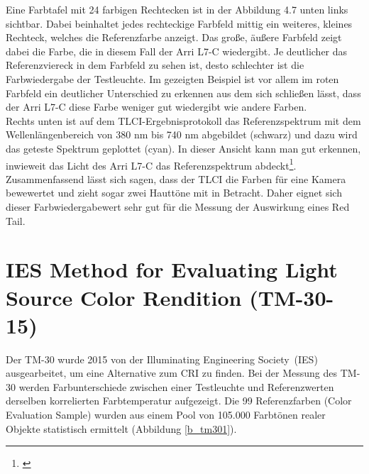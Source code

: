 Eine Farbtafel mit 24 farbigen Rechtecken ist in der Abbildung 4.7 unten links sichtbar. Dabei beinhaltet jedes rechteckige Farbfeld mittig ein weiteres, kleines Rechteck, welches die Referenzfarbe anzeigt. Das große, äußere Farbfeld zeigt dabei die Farbe, die in diesem Fall der Arri L7-C wiedergibt. Je deutlicher das Referenzviereck in dem Farbfeld zu sehen ist, desto schlechter ist die Farbwiedergabe der Testleuchte. Im gezeigten Beispiel ist vor allem im roten Farbfeld ein deutlicher Unterschied zu erkennen aus dem sich schließen lässt, dass der Arri L7-C diese Farbe weniger gut wiedergibt wie andere Farben.\\ 
Rechts unten ist auf dem TLCI-Ergebnisprotokoll das Referenzspektrum mit dem Wellenlängenbereich von 380 nm bis 740 nm abgebildet (schwarz) und dazu wird das geteste Spektrum geplottet (cyan). In dieser Ansicht kann man gut erkennen, inwieweit das Licht des Arri L7-C das Referenzspektrum abdeckt\footnote{\cite[15]{roberts}}.\\

Zusammenfassend lässt sich sagen, dass der TLCI die Farben für eine Kamera bewewertet und zieht sogar zwei Hauttöne mit in Betracht. Daher eignet sich dieser Farbwiedergabewert sehr gut für die Messung der Auswirkung eines Red Tail.  


\newpage
\section{IES Method for Evaluating Light Source Color Rendition (TM-30-15)} \label{sec_tm30}

Der TM-30 wurde 2015 von der \glqq Illuminating Engineering Society\grqq\ (IES) ausgearbeitet, um eine Alternative zum CRI zu finden. Bei der Messung des TM-30 werden Farbunterschiede zwischen einer Testleuchte und Referenzwerten derselben korrelierten Farbtemperatur aufgezeigt.
Die 99 Referenzfarben (Color Evaluation Sample) wurden aus einem Pool von 105.000 Farbtönen realer Objekte statistisch ermittelt (Abbildung \ref{b_tm301}).

